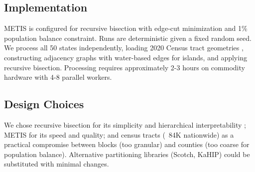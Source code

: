 \subsection{Implementation}

METIS is configured for recursive bisection with edge-cut minimization and 1\% population balance constraint. Runs are deterministic given a fixed random seed. We process all 50 states independently, loading 2020 Census tract geometries \cite{census2020redistricting}, constructing adjacency graphs with water-based edges for islands, and applying recursive bisection. Processing requires approximately 2-3 hours on commodity hardware with 4-8 parallel workers.

\subsection{Design Choices}

We chose recursive bisection for its simplicity and hierarchical interpretability \cite{hess1965nonpartisan}; METIS for its speed and quality; and census tracts (~84K nationwide) as a practical compromise between blocks (too granular) and counties (too coarse for population balance). Alternative partitioning libraries (Scotch, KaHIP) could be substituted with minimal changes.
